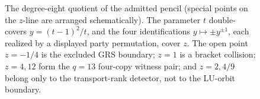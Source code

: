 \begin{figure}[tbp]
\caption{The degree-eight quotient of the admitted pencil (special points on
the \(z\)-line are arranged schematically).  The parameter \(t\)
double-covers \(y=(t-1)^2/t\), and the four identifications
\(y\mapsto\pm y^{\pm1}\), each realized by a displayed party permutation,
cover \(z\).  The open point \(z=-1/4\) is the excluded GRS boundary;
\(z=1\) is a bracket collision; \(z=4,12\) form the \(q=13\) four-copy
witness pair; and \(z=2,4/9\) belong only to the transport-rank detector,
not to the LU-orbit boundary.}
\label{fig:pencil-quotient}
\end{figure}
